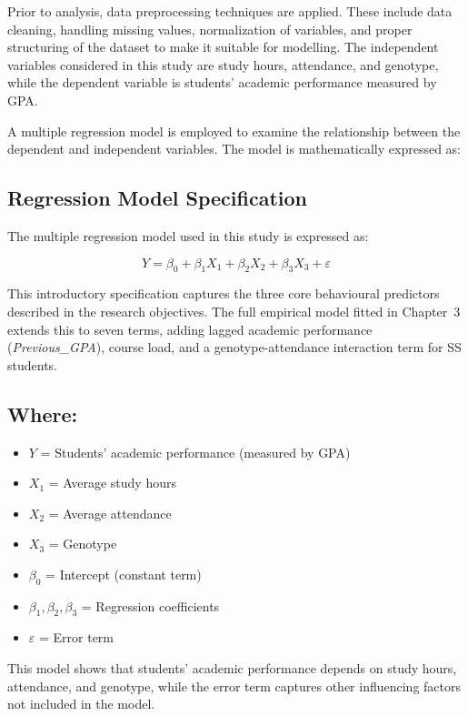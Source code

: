 \documentclass[12pt]{report}
\begin{document}
	Prior to analysis, data preprocessing techniques are applied. These include data cleaning, handling missing values, normalization of variables, and proper structuring of the dataset to make it suitable for modelling. The independent variables considered in this study are study hours, attendance, and genotype, while the dependent variable is students’ academic performance measured by GPA.
	
	A multiple regression model is employed to examine the relationship between the dependent and independent variables. The model is mathematically expressed as:
	\subsection{Regression Model Specification}
	
	The multiple regression model used in this study is expressed as:
	
	\begin{equation}
		Y = \beta_0 + \beta_1 X_1 + \beta_2 X_2 + \beta_3 X_3 + \varepsilon
	\end{equation}
	
	This introductory specification captures the three core behavioural
	predictors described in the research objectives. The full empirical
	model fitted in Chapter~3 extends this to seven terms, adding lagged
	academic performance (\textit{Previous\_GPA}), course load, and a
	genotype-attendance interaction term for SS students.
	
	\subsection*{Where:}
	
	\begin{itemize}
		\item $Y$ = Students’ academic performance (measured by GPA)
		\item $X_1$ = Average study hours
		\item $X_2$ = Average attendance
		\item $X_3$ = Genotype
		\item $\beta_0$ = Intercept (constant term)
		\item $\beta_1, \beta_2, \beta_3$ = Regression coefficients
		\item $\varepsilon$ = Error term
	\end{itemize}
	
	This model shows that students’ academic performance depends on study hours, attendance, and genotype, while the error term captures other influencing factors not included in the model.
	
\end{document}
